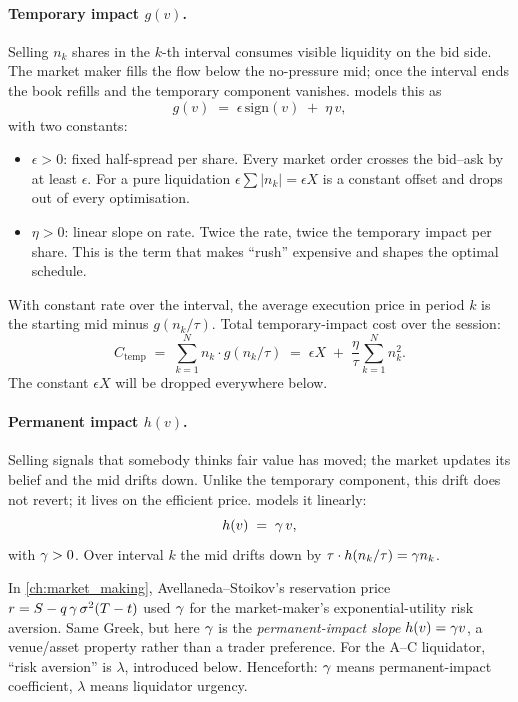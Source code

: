 \paragraph{Temporary impact $g(v)$.} Selling $n_k$ shares in the
$k$-th interval consumes visible liquidity on the bid side. The
market maker fills the flow below the no-pressure mid; once the
interval ends the book refills and the temporary component
vanishes. \citeAC{} models this as
\begin{equation}
  g(v) \;=\; \epsilon\,\mathrm{sign}(v) \;+\; \eta\, v,
  \label{eq:ac_temp}
\end{equation}
with two constants:
\begin{itemize}
  \item $\epsilon > 0$: fixed half-spread per share. Every market
  order crosses the bid--ask by at least $\epsilon$. For a pure
  liquidation $\epsilon\sum|n_k| = \epsilon X$ is a constant
  offset and drops out of every optimisation.
  \item $\eta > 0$: linear slope on rate. Twice the rate, twice
  the temporary impact per share. This is the term that makes
  ``rush'' expensive and shapes the optimal schedule.
\end{itemize}
With constant rate over the interval, the average execution price
in period $k$ is the starting mid minus $g(n_k/\tau)$. Total
temporary-impact cost over the session:
\begin{equation}
  C_{\text{temp}} \;=\; \sum_{k=1}^N n_k \cdot g(n_k/\tau)
   \;=\; \epsilon X \;+\; \frac{\eta}{\tau}\sum_{k=1}^N n_k^2.
   \label{eq:ac_ctemp}
\end{equation}
The constant $\epsilon X$ will be dropped everywhere below.

\paragraph{Permanent impact $h(v)$.} Selling signals that somebody
thinks fair value has moved; the market updates its belief and
the mid drifts down. Unlike the temporary component, this drift
does not revert; it lives on the efficient price. \citeAC{}
models it linearly:
\begin{equation}
  h(v) \;=\; \gamma\, v,
  \label{eq:ac_perm}
\end{equation}
with $\gamma > 0$. Over interval $k$ the mid drifts down by
$\tau\cdot h(n_k/\tau) = \gamma n_k$.

\begin{pitfallbox}
In \cref{ch:market_making}, Avellaneda--Stoikov's reservation price
$r = S - q\,\gamma\,\sigma^2(T-t)$ used $\gamma$ for the
market-maker's exponential-utility risk aversion. Same Greek, but
here $\gamma$ is the \emph{permanent-impact slope} $h(v) = \gamma
v$, a venue/asset property rather than a trader preference. For the
A--C liquidator, ``risk aversion'' is $\lambda$, introduced below.
Henceforth: $\gamma$ means permanent-impact coefficient, $\lambda$
means liquidator urgency.
\end{pitfallbox}

